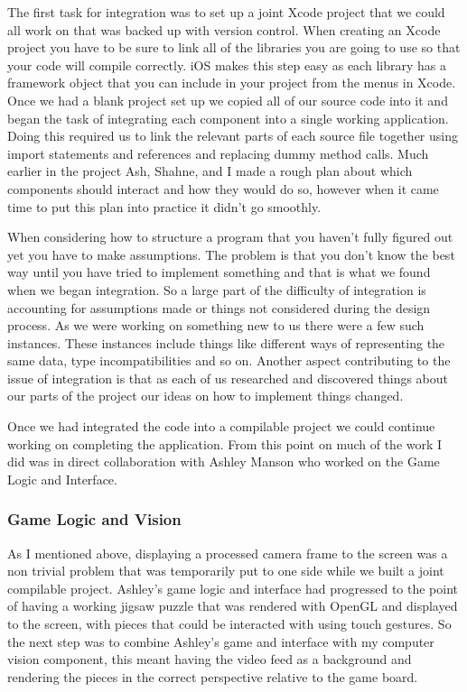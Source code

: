 \documentclass{article}
\begin{document}
The first task for integration was to set up a joint Xcode project that we could all work on that was backed up with version control. When creating an Xcode project you have to be sure to link all of the libraries you are going to use so that your code will compile correctly. iOS makes this step easy as each library has a framework object that you can include in your project from the menus in Xcode. Once we had a blank project set up we copied all of our source code into it and began the task of integrating each component into a single working application. Doing this required us to link the relevant parts of each source file together using import statements and references and replacing dummy method calls. Much earlier in the project Ash, Shahne, and I made a rough plan about which components should interact and how they would do so, however when it came time to put this plan into practice it didn't go smoothly. 

When considering how to structure a program that you haven't fully figured out yet you have to make assumptions. The problem is that you don't know the best way until you have tried to implement something and that is what we found when we began integration. So a large part of the difficulty of integration is accounting for assumptions made or things not considered during the design process. As we were working on something new to us there were a few such instances. These instances include things like different ways of representing the same data, type incompatibilities and so on. Another aspect contributing to the issue of integration is that as each of us researched and discovered things about our parts of the project our ideas on how to implement things changed.

Once we had integrated the code into a compilable project we could continue working on completing the application. From this point on much of the work I did was in direct collaboration with Ashley Manson who worked on the Game Logic and Interface. 

\subsubsection{Game Logic and Vision}




As I mentioned above, displaying a processed camera frame to the screen was a non trivial problem that was temporarily put to one side while we built a joint compilable project. Ashley's game logic and interface had progressed to the point of having a working jigsaw puzzle that was rendered with OpenGL and displayed to the screen, with pieces that could be interacted with using touch gestures. So the next step was to combine Ashley's game and interface with my computer vision component, this meant having the video feed as a background and rendering the pieces in the correct perspective relative to the game board. 
\end{document}
